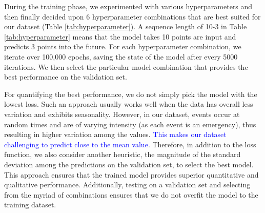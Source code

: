 During the training phase, we experimented with various hyperparameters and then finally decided upon 6 hyperparameter combinations that are best suited for our dataset  (Table \ref{tab:hyperparameter}).  A sequence length of 10-3  in Table \ref{tab:hyperparameter} means that the model takes 10 points are input and predicts 3 points into the future. For each hyperparameter combination, we iterate over 100,000 epochs, saving the state of the model after every 5000 iterations. We then select the particular model combination that provides the best performance on the validation set.  

For quantifying the best performance, we do not simply pick the model with the lowest loss.  Such an approach usually works well when the data has overall less variation and exhibits seasonality. However, in our dataset,  events occur at random times and are of varying intensity (as each event is an emergency), thus resulting in higher variation among the values. \textcolor{blue}{This makes our dataset challenging to predict close to the mean value}. Therefore, in addition to the loss function, we also consider another heuristic, the magnitude of the standard deviation among the predictions on the validation set, to select the best model. This approach ensures that the trained model provides superior quantitative and qualitative performance. Additionally, testing on a validation set and selecting from the myriad of combinations  ensures  that we do not overfit the model to the training dataset. 









